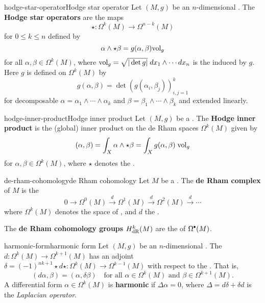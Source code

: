 \begin{topic}{hodge-star-operator}{Hodge star operator}
    Let $(M, g)$ be an $n$-dimensional . The \textbf{Hodge star operators} are the maps
    \[ \star : \Omega^k(M) \to \Omega^{n - k}(M) \]
    for $0 \le k \le n$ defined by
    \[ \alpha \wedge \star \beta = g(\alpha, \beta) \textup{vol}_g \]
    for all $\alpha, \beta \in \Omega^k(M)$, where $\textup{vol}_g = \sqrt{|\det g|} \; dx_1 \wedge \cdots dx_n$ is the  induced by $g$. Here $g$ is defined on $\Omega^k(M)$ by
    \[ g(\alpha, \beta) = \det\left(g(\alpha_i, \beta_j)\right)_{i, j = 1}^{k} \]
    for decomposable $\alpha = \alpha_1 \wedge \cdots \wedge \alpha_k$ and $\beta = \beta_1 \wedge \cdots \wedge \beta_k$ and extended linearly.
\end{topic}

\begin{topic}{hodge-inner-product}{Hodge inner product}
    Let $(M, g)$ be a . The \textbf{Hodge inner product} is the (global) inner product on the de Rham spaces $\Omega^k(M)$ given by
    \[ (\alpha, \beta) = \int_X \alpha \wedge \star \beta = \int_X g(\alpha, \beta) \; \textup{vol}_g \]
    for $\alpha, \beta \in \Omega^k(M)$, where $\star$ denotes the .
\end{topic}

\begin{topic}{de-rham-cohomology}{de Rham cohomology}
    Let $M$ be a . The \textbf{de Rham complex} of $M$ is the 
    \[ 0 \to \Omega^0(M) \xrightarrow{d} \Omega^1(M) \xrightarrow{d} \Omega^2(M) \xrightarrow{d} \cdots \]
    where $\Omega^k(M)$ denotes the space of , and $d$ the .
    
    The \textbf{de Rham cohomology groups} $H_\textup{dR}^k(M)$ are the  of $\Omega^\bdot(M)$.
\end{topic}

\begin{topic}{harmonic-form}{harmonic form}
    Let $(M, g)$ be an $n$-dimensional . The  $d : \Omega^k(M) \to \Omega^{k + 1}(M)$ has an adjoint $\delta = (-1)^{nk + 1} \star d \star : \Omega^k(M) \to \Omega^{k - 1}(M)$ with respect to the . That is,
    \[ (d \alpha, \beta) = (\alpha, \delta \beta) \quad \text{for all } \alpha \in \Omega^k(M) \text{ and } \beta \in \Omega^{k + 1}(M) . \]
    A differential form $\alpha \in \Omega^k(M)$ is \textbf{harmonic} if $\Delta \alpha = 0$, where $\Delta = d \delta + \delta d$ is the \textit{Laplacian operator}.
\end{topic}


